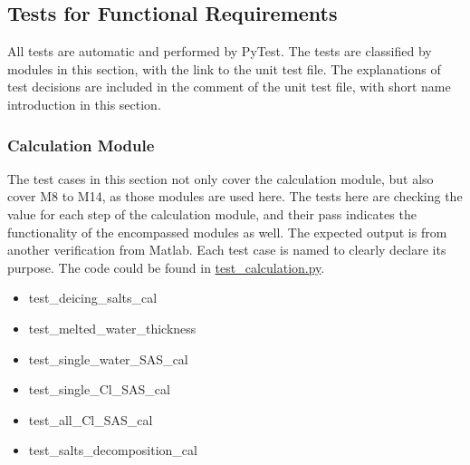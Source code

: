 \documentclass[12pt, titlepage]{article}
\begin{document}

\subsection{Tests for Functional Requirements}
All tests are automatic and performed by PyTest. The tests are classified by modules in this section, with the link to the unit test file. The explanations of test decisions are included in the comment of the unit test file, with short name introduction in this section.


\subsubsection{Calculation Module} \label{CM}
The test cases in this section not only cover the calculation module, but also cover M8 to M14, as those modules are used here. The tests here are checking the value for each step of the calculation module, and their pass indicates the functionality of the encompassed modules as well. The expected output is from another verification from Matlab. Each test case is named to clearly declare its purpose. The code could be found in \href{https://github.com/CynthiaLiu0805/BridgeCorrosion/blob/main/tests/test_calculation.py}{test\_calculation.py}.
\begin{itemize}
\item test\_deicing\_salts\_cal
\item test\_melted\_water\_thickness
\item test\_single\_water\_SAS\_cal
\item test\_single\_Cl\_SAS\_cal
\item test\_all\_Cl\_SAS\_cal
\item test\_salts\_decomposition\_cal
\end{itemize}
\end{document}
